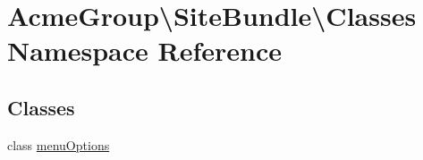 \hypertarget{namespace_acme_group_1_1_site_bundle_1_1_classes}{\section{Acme\+Group\textbackslash{}Site\+Bundle\textbackslash{}Classes Namespace Reference}
\label{namespace_acme_group_1_1_site_bundle_1_1_classes}
}
\subsection*{Classes}
\begin{DoxyCompactItemize}
\item 
class \hyperlink{class_acme_group_1_1_site_bundle_1_1_classes_1_1menu_options}{menu\+Options}
\end{DoxyCompactItemize}
